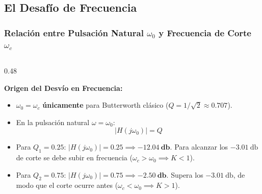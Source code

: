 
\subsection{El Desafío de Frecuencia}
\begin{frame}
  \frametitle{Relación entre Pulsación Natural $\omega_0$ y Frecuencia de Corte $\omega_c$}

  \begin{columns}[t, onlytextwidth]
    \begin{column}{0.48\textwidth}
      \begin{tarjeta}
        {\fontsize{9pt}{11pt}\selectfont \textbf{\color{AlertAmber} Origen del Desvío en Frecuencia:}}\\[2pt]
        {\fontsize{8pt}{10pt}\selectfont
        \begin{itemize}\setlength{\itemsep}{1.5pt}
          \item $\omega_0 = \omega_c$ \textbf{únicamente} para Butterworth clásico ($Q = 1/\sqrt{2} \approx 0.707$).
          \item En la pulsación natural $\omega = \omega_0$:
          \[ |H(j\omega_0)| = Q \]
          \item Para $Q_1 = 0.25$: $|H(j\omega_0)| = 0.25 \implies \mathbf{-12.04\ \unit{\decibel}}$.
          Para alcanzar los $\qty{-3.01}{\decibel}$ de corte se debe subir en frecuencia ($\omega_c > \omega_0 \implies K < 1$).
          \item Para $Q_2 = 0.75$: $|H(j\omega_0)| = 0.75 \implies \mathbf{-2.50\ \unit{\decibel}}$.
          Supera los $\qty{-3.01}{\decibel}$, de modo que el corte ocurre antes ($\omega_c < \omega_0 \implies K > 1$).
        \end{itemize}
        }
      \end{tarjeta}
    \end{column}


\end{columns}
\end{frame}
